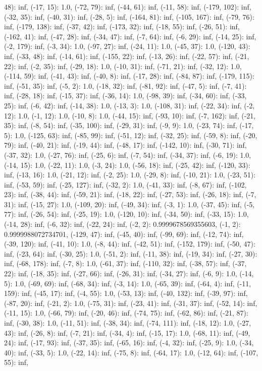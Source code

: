 \documentclass[parskip=half]{scrartcl}
\begin{document}
48): inf, (-17, 15): 1.0, (-72, 79): inf, (-44, 61): inf, (-11, 58): inf, (-179, 102): inf, (-32, 35): inf, (-40, 31): inf, (-28, 5): inf, (-164, 81): inf, (-105, 167): inf, (-79, 76): inf, (-179, 138): inf, (-37, 42): inf, (-173, 32): inf, (-18, 55): inf, (-26, 51): inf, (-162, 41): inf, (-47, 28): inf, (-34, 47): inf, (-7, 64): inf, (-6, 29): inf, (-14, 25): inf, (-2, 179): inf, (-3, 34): 1.0, (-97, 27): inf, (-24, 11): 1.0, (-45, 37): 1.0, (-120, 43): inf, (-33, 48): inf, (-14, 61): inf, (-155, 22): inf, (-13, 26): inf, (-22, 57): inf, (-21, 22): inf, (-2, 35): inf, (-29, 18): 1.0, (-10, 31): inf, (-71, 21): inf, (-32, 12): 1.0, (-114, 59): inf, (-41, 43): inf, (-40, 8): inf, (-17, 28): inf, (-84, 87): inf, (-179, 115): inf, (-51, 35): inf, (-5, 2): 1.0, (-18, 32): inf, (-81, 92): inf, (-47, 5): inf, (-7, 41): inf, (-28, 18): inf, (-15, 37): inf, (-36, 14): 1.0, (-98, 39): inf, (-34, 60): inf, (-33, 25): inf, (-6, 42): inf, (-14, 38): 1.0, (-13, 3): 1.0, (-108, 31): inf, (-22, 34): inf, (-2, 12): 1.0, (-1, 12): 1.0, (-10, 8): 1.0, (-44, 15): inf, (-93, 10): inf, (-7, 162): inf, (-21, 35): inf, (-8, 54): inf, (-35, 100): inf, (-29, 31): inf, (-9, 9): 1.0, (-23, 74): inf, (-17, 5): 1.0, (-125, 63): inf, (-85, 99): inf, (-51, 12): inf, (-32, 25): inf, (-59, 8): inf, (-20, 79): inf, (-40, 21): inf, (-19, 44): inf, (-48, 17): inf, (-142, 10): inf, (-30, 71): inf, (-37, 32): 1.0, (-27, 76): inf, (-25, 6): inf, (-7, 54): inf, (-34, 37): inf, (-6, 19): 1.0, (-14, 15): 1.0, (-22, 11): 1.0, (-3, 24): 1.0, (-56, 18): inf, (-25, 42): inf, (-120, 33): inf, (-13, 16): 1.0, (-21, 12): inf, (-2, 25): 1.0, (-29, 8): inf, (-10, 21): 1.0, (-23, 51): inf, (-53, 59): inf, (-25, 127): inf, (-32, 2): 1.0, (-41, 33): inf, (-8, 67): inf, (-102, 23): inf, (-38, 44): inf, (-59, 21): inf, (-18, 22): inf, (-27, 53): inf, (-26, 18): inf, (-7, 31): inf, (-15, 27): 1.0, (-109, 20): inf, (-49, 34): inf, (-3, 1): 1.0, (-37, 45): inf, (-5, 77): inf, (-26, 54): inf, (-25, 19): 1.0, (-120, 10): inf, (-34, 50): inf, (-33, 15): 1.0, (-14, 28): inf, (-6, 32): inf, (-22, 24): inf, (-2, 2): 0.9999678569355603, (-1, 2): 0.9999988072734701, (-129, 47): inf, (-45, 40): inf, (-99, 69): inf, (-12, 74): inf, (-39, 120): inf, (-41, 10): 1.0, (-8, 44): inf, (-42, 51): inf, (-152, 179): inf, (-50, 47): inf, (-23, 64): inf, (-30, 25): 1.0, (-51, 2): inf, (-11, 38): inf, (-19, 34): inf, (-27, 30): inf, (-68, 178): inf, (-7, 8): 1.0, (-61, 37): inf, (-110, 32): inf, (-38, 57): inf, (-37, 22): inf, (-18, 35): inf, (-27, 66): inf, (-26, 31): inf, (-34, 27): inf, (-6, 9): 1.0, (-14, 5): 1.0, (-69, 69): inf, (-68, 34): inf, (-3, 14): 1.0, (-65, 39): inf, (-64, 4): inf, (-11, 159): inf, (-45, 17): inf, (-4, 55): 1.0, (-53, 13): inf, (-40, 132): inf, (-39, 97): inf, (-87, 20): inf, (-21, 2): 1.0, (-75, 31): inf, (-23, 41): inf, (-31, 37): inf, (-52, 14): inf, (-11, 15): 1.0, (-66, 79): inf, (-20, 46): inf, (-74, 75): inf, (-62, 86): inf, (-21, 87): inf, (-30, 38): 1.0, (-11, 51): inf, (-38, 34): inf, (-74, 111): inf, (-18, 12): 1.0, (-27, 43): inf, (-26, 8): inf, (-7, 21): inf, (-34, 4): inf, (-15, 17): 1.0, (-68, 11): inf, (-49, 24): inf, (-17, 93): inf, (-37, 35): inf, (-65, 16): inf, (-4, 32): inf, (-25, 9): 1.0, (-34, 40): inf, (-33, 5): 1.0, (-22, 14): inf, (-75, 8): inf, (-64, 17): 1.0, (-12, 64): inf, (-107, 55): inf, 
\end{document}
